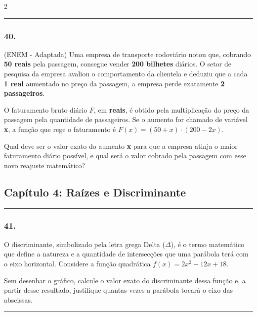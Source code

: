 \documentclass[twoside, 10pt, a4paper]{article}
\newlength{\espacoPosTitulo}
\newlength{\espacoPreQuestao}
\newlength{\espacoQuestao}
\begin{document}
\begin{multicols*}{2}
\noindent\textcolor{CorLinha}{\rule{\linewidth}{0.5pt}} 
\par\vspace{\espacoPreQuestao}
\subsubsection*{40.} (ENEM - Adaptada) Uma empresa de transporte rodoviário notou que, cobrando \textbf{50 reais} pela passagem, consegue vender \textbf{200 bilhetes} diários. O setor de pesquisa da empresa avaliou o comportamento da clientela e deduziu que a cada \textbf{1 real} aumentado no preço da passagem, a empresa perde exatamente \textbf{2 passageiros}.

O faturamento bruto diário $F$, em \textbf{reais}, é obtido pela multiplicação do preço da passagem pela quantidade de passageiros. Se o aumento for chamado de variável \textbf{x}, a função que rege o faturamento é $F(x) = (50 + x) \cdot (200 - 2x)$.

Qual deve ser o valor exato do aumento \textbf{x} para que a empresa atinja o maior faturamento diário possível, e qual será o valor cobrado pela passagem com esse novo reajuste matemático?
\par\vspace{\espacoQuestao}
\subsection*{Capítulo 4: Raízes e Discriminante}
\vspace{-0.2cm}\noindent\rule{\linewidth}{1.5pt} 
\par\vspace{\espacoPosTitulo}
\subsubsection*{41.} O discriminante, simbolizado pela letra grega Delta ($\Delta$), é o termo matemático que define a natureza e a quantidade de intersecções que uma parábola terá com o eixo horizontal. Considere a função quadrática $f(x) = 2x^2 - 12x + 18$.

Sem desenhar o gráfico, calcule o valor exato do discriminante dessa função e, a partir desse resultado, justifique quantas vezes a parábola tocará o eixo das abscissas.
\par\vspace{\espacoQuestao}

\noindent\textcolor{CorLinha}{\rule{\linewidth}{0.5pt}} 
\par\vspace{\espacoPreQuestao}

\end{multicols*}
\end{document}

